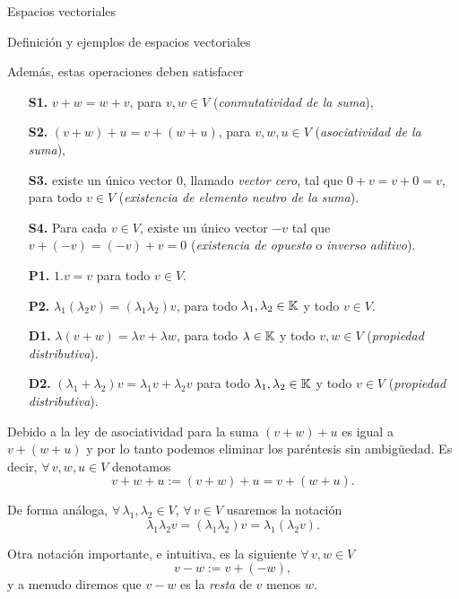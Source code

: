 \begin{chapter}{Espacios vectoriales}
\begin{section}{Definici\'on y ejemplos de espacios vectoriales}
\begin{definicion}
\begin{enumerate}
                \end{enumerate}	 
                Además, estas operaciones deben satisfacer 
                \begin{enumerate}
                    \item[\textbf{S1.}] $v + w = w + v$, para $v,w \in V$ (\textit{conmutatividad de la suma}),
                    \item[\textbf{S2.}] $(v+ w)+ u = v + (w+u)$, para $v,w,u \in V$ (\textit{asociatividad de la suma}),
                    \item[\textbf{S3.}] existe un único vector $0$, llamado \textit{vector cero}, tal que $0+ v = v + 0 =v$, para todo $v \in V$ (\textit{existencia de elemento neutro de la suma}).
                    \item[\textbf{S4.}] Para cada $v \in V$, existe un  único vector $-v$ tal que  $v + (-v) = (-v)+ v =0$ (\textit{existencia de opuesto} o  \textit{inverso aditivo}).
                    \item[\textbf{P1.}] $1.v=v$ para todo $v \in V$.
                    \item[\textbf{P2.}] $\lambda_1(\lambda_2v) = (\lambda_1\lambda_2)v$, para todo $\lambda_1,\lambda_2 \in \mathbb K$ y todo $v \in V$.
                    \item[\textbf{D1.}] $\lambda(v+w) = \lambda v +\lambda w$, para todo $\lambda \in \mathbb K$ y todo $v,w \in V$ (\textit{propiedad distributiva}).
                    \item[\textbf{D2.}] $(\lambda_1+\lambda_2)v = \lambda_1v + \lambda_2 v$ para todo $\lambda_1,\lambda_2 \in \mathbb K$ y todo $v \in V$ (\textit{propiedad distributiva}).
                \end{enumerate}
            \end{definicion}
            
            Debido a la ley de asociatividad para la suma $(v+w)+u$ es igual a $v+(w+u)$ y por lo tanto podemos eliminar los paréntesis sin ambigüedad. Es decir, 	$\forall\, v,w,u \in V$ denotamos 
            $$
            v + w + u := (v+w)+u =v+(w+u).
            $$
            
            De forma análoga, $\forall\, \lambda_1,\lambda_2 \in V$, $\forall \, v \in V$ usaremos la notación
            $$
            \lambda_1\lambda_2v  = (\lambda_1\lambda_2)v = \lambda_1(\lambda_2v).
            $$
            
            Otra notación importante, e intuitiva, es la siguiente	$\forall\, v,w \in V$
            $$
            v-w := v+(-w),
            $$
            y a menudo diremos que $v-w$ es la \textit{resta} de $v$ menos $w$. 
            

\end{section}
\end{chapter}
